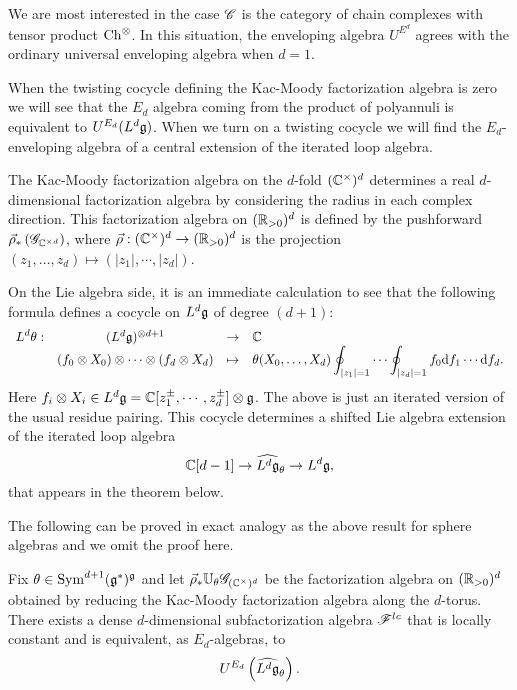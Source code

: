 \documentclass[10pt]{amsart}
\begin{document}
We are most interested in the case $\mathscr C$ is the category of chain complexes with tensor product ${\rm Ch}^{\otimes}$. 
In this situation, the enveloping algebra $U^{E^d}$ agrees with the ordinary universal enveloping algebra when $d=1$.

When the twisting cocycle defining the Kac-Moody factorization algebra is zero we will see that the $E_d$ algebra coming from the product of polyannuli is equivalent to $U^{E_d} (L^d \mathfrak g)$.
When we turn on a twisting cocycle we will find the $E_d$-enveloping algebra of a central extension of the iterated loop algebra. 

The Kac-Moody factorization algebra on the $d$-fold $(\mathbb C^\times)^d$ determines a real $d$-dimensional factorization algebra by considering the radius in each complex direction. 
This factorization algebra on $(\mathbb R_{>0})^d$ is defined by the pushforward $\vec{\rho}_*\left(\mathscr G_{\mathbb C^{\times d}}\right)$, 
where $\vec{\rho} : (\mathbb C^\times)^d \to (\mathbb R_{>0})^d$ is the projection $(z_1,\ldots,z_d) \mapsto (|z_1|, \cdots, |z_d|)$. 

On the Lie algebra side, it is an immediate calculation to see that the following formula defines a cocycle on $L^d \mathfrak g$ of degree $(d+1)$:
\[
\begin{array}{cccl}
\displaystyle L^d \theta : & (L^d \mathfrak g)^{\otimes d + 1} & \to & \mathbb C \\
\displaystyle & (f_0 \otimes X_0)\otimes \cdots \otimes (f_d \otimes X_d) & \mapsto & \displaystyle  \theta(X_0,\ldots,X_d)  \oint_{|z_1| = 1} \cdots \oint_{|z_d| = 1} f_0 {\rm d} f_1 \cdots {\rm d} f_d .
\end{array}
\]
Here $f_i \otimes X_i \in L^d \mathfrak g = \mathbb C[z_1^{\pm}, \cdots, z_d^{\pm}] \otimes \mathfrak g$. 
The above is just an iterated version of the usual residue pairing.
This cocycle determines a shifted Lie algebra extension of the iterated loop algebra
\[
\mathbb C[d-1] \to \widehat{L^d \mathfrak g}_\theta \to L^d \mathfrak g,
\]
that appears in the theorem below. 

The following can be proved in exact analogy as the above result for sphere algebras and we omit the proof here.

\begin{prop}
Fix $\theta \in {\rm Sym}^{d+1}(\mathfrak g^*)^\mathfrak g$ and let $\vec{\rho}_* \mathbb U_\theta \mathscr G_{(\mathbb C^\times)^d}$ be the factorization algebra on $(\mathbb R_{>0})^d$ obtained by reducing the Kac-Moody factorization algebra along the $d$-torus.
There exists a dense $d$-dimensional subfactorization algebra $\mathscr F^{lc}$ that is locally constant and is equivalent, as $E_d$-algebras, to
\[
U^{E_d} \left( \widehat{L^d \mathfrak g}_{\theta} \right) .
\]
\end{prop}
\end{document}
